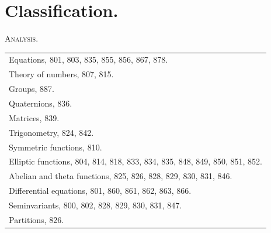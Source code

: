 \documentclass[11pt,a4paper]{book}
\begin{document}
\section*{Classification.}

\begin{center}
\textsc{Analysis.}
\end{center}
\begin{center}
\begin{tabular}{p{12cm}}
Equations, 801, 803, 835, 855, 856, 867, 878.\\
Theory of numbers, 807, 815.\\
Groups, 887.\\
Quaternions, 836.\\
Matrices, 839.\\
Trigonometry, 824, 842.\\
Symmetric functions, 810.\\
Elliptic functions, 804, 814, 818, 833, 834, 835, 848, 849, 850, 851, 852.\\
Abelian and theta functions, 825, 826, 828, 829, 830, 831, 846.\\
Differential equations, 801, 860, 861, 862, 863, 866.\\
Seminvariants, 800, 802, 828, 829, 830, 831, 847.\\
Partitions, 826.\\
\end{tabular}
\end{center}
\end{document}

